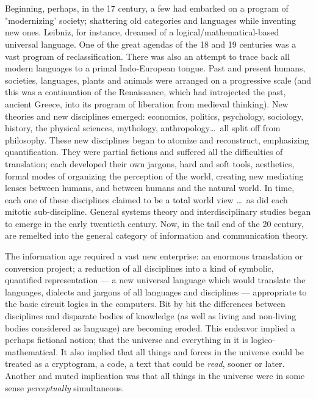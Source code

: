 \chapter{}

Beginning, perhaps, in the 17 century, a
few had embarked on a program of "modernizing' society; shattering old categories
and languages while inventing new ones.
Leibniz, for instance, dreamed of a logical\slash mathematical-based universal language. One
of the great agendas of the 18 and 19
centuries was a vast program of reclassification. 
There was also an attempt to trace back
all modern languages to a primal Indo-European tongue. Past and present humans,
societies, languages, plants and animals were
arranged on a progressive scale (and this was
a continuation of the Renaissance, which
had introjected the past, ancient Greece, into
its program of liberation from medieval
thinking). New theories and new disciplines
emerged: economics, politics, psychology,
sociology, history, the physical sciences,
mythology, anthropology\ldots\ all split off
from philosophy. These new disciplines began to atomize and reconstruct, emphasizing quantification. They were partial fictions
and suffered all the difficulties of translation; each developed their own jargons, hard
and soft tools, aesthetics, formal modes of
organizing the perception of the world,
creating new mediating lenses between humans, and between humans and the natural
world. In time, each one of these disciplines
claimed to be a total world view \ldots\ as did
each mitotic sub-discipline. General systems
theory and interdisciplinary studies began
to emerge in the early twentieth century.
Now, in the tail end of the 20 century, are
remelted into the general category of information and communication theory.

The information age required a vast new
enterprise: an enormous translation or conversion project; a reduction of all disciplines
into a kind of symbolic, quantified representation --- a new universal language which
would translate the languages, dialects and jargons of all languages and disciplines ---
appropriate to the basic circuit logics in the computers. Bit by bit the differences between
disciplines and disparate bodies of knowledge (as well as living and non-living bodies
considered as language) are becoming eroded. This endeavor implied a perhaps fictional
notion; that the universe and everything in it is logico-mathematical. It also implied
that all things and forces in the universe could be treated as a cryptogram, a code, a
text that could be \emph{read}, sooner or later. Another and muted implication was that all
things in the universe were in some sense \emph{perceptually} simultaneous.

